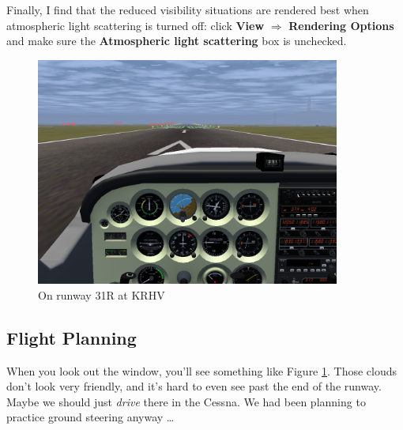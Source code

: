 Finally, I find that the reduced visibility situations are rendered
best when atmospheric light scattering is turned off: click
\textbf{\textsf{View}} $\Rightarrow$ \textbf{\textsf{Rendering
    Options}} and make sure the \textbf{\textsf{Atmospheric light
    scattering}} box is unchecked.





\begin{figure}
  \begin{center}
    \includegraphics[width=10cm]{img/KRHV}
    \caption{On runway 31R at KRHV}
    \label{fig:KRHV}
  \end{center}
\end{figure}

\subsection{Flight Planning}

When you look out the window, you'll see something like Figure
\ref{fig:KRHV}.  Those clouds don't look very friendly, and it's hard
to even see past the end of the runway.  Maybe we should just
\emph{drive} there in the Cessna.  We had been planning to practice
ground steering anyway \ldots{}

